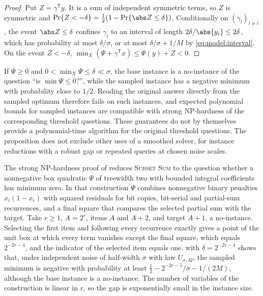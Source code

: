 \begin{proof}
Put $Z=\gamma^{\mathsf T}y$. It is a sum of independent symmetric terms, so
$Z$ is symmetric and $\Pr\{Z<-\delta\}=\frac12(1-\Pr\{\abs Z\le\delta\})$.
Conditionally on $(\gamma_l)_{l\ne i}$, the event $\abs Z\le\delta$ confines
$\gamma_i$ to an interval of length $2\delta/\abs{y_i}\le2\delta$, which has
probability at most $\delta/\sigma$, or at most $\delta/\sigma+1/M$ by
\eqref{eq:model:interval}. On the event $Z<-\delta$,
$\min_X(\Psi+\gamma^{\mathsf T}x)\le\Psi(y)+Z<0$.
\end{proof}

If $\Psi\ge0$ and $0<\min_X\Psi\le\delta\ll\sigma$, the base instance is a
no-instance of the question ``is $\min\Psi\le0$?'', while the sampled
instance has a negative minimum with probability close to $1/2$. Reading
the original answer directly from the sampled optimum therefore fails on
such instances, and expected polynomial bounds for sampled instances are
compatible with strong NP-hardness of the corresponding threshold
questions. These guarantees do not by themselves provide a polynomial-time
algorithm for the original threshold questions. The proposition does not
exclude other uses of a smoothed solver, for instance reductions with a
robust gap or repeated queries at chosen noise scales.

\begin{remark}\label{rem:lim:dk}
The strong NP-hardness proof of \citet{pia2026-treewidth-and-the-complexity-of}
reduces \textsc{Subset Sum} to the question whether a nonnegative box
quadratic $\Psi$ of treewidth two with bounded integral coefficients has
minimum zero. In that construction $\Psi$ combines nonnegative binary
penalties $x_i(1-x_i)$ with squared residuals for bit copies, bit-serial and
partial-sum recurrences, and a final square that compares the selected
partial sum with the target. Take
$r\ge1$, $A=2^r$, items $A$ and $A+2$, and target $A+1$, a no-instance. Selecting
the first item and following every recurrence exactly gives a point of the
unit box at which every term vanishes except the final square, which equals
$2^{-2r-4}$, and the indicator of the selected item equals one.
 with $\delta=2^{-2r-4}$ shows that, under
independent noise of half-width $\sigma$ with law $U_{\sigma,M}$, the sampled
minimum is negative with probability at least
$\frac12-2^{-2r-5}/\sigma-1/(2M)$, although the base instance is a
no-instance. The number of variables of the construction is linear in $r$,
so the gap is exponentially small in the instance size.
\end{remark}

